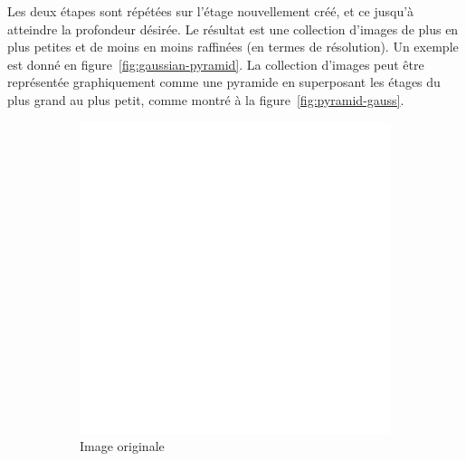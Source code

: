 \bigskip

Les deux étapes sont répétées sur l'étage nouvellement créé, et ce jusqu'à atteindre la profondeur désirée. Le résultat est une collection d'images de plus en plus petites et de moins en moins raffinées (en termes de résolution). Un exemple est donné en figure~\ref{fig:gaussian-pyramid}. La collection d'images peut être représentée graphiquement comme une pyramide en superposant les étages du plus grand au plus petit, comme montré à la figure~\ref{fig:pyramid-gauss}.

\begin{figure}[h]
    \centering

    \begin{subfigure}{.3\textwidth}
        \centering
        \includegraphics[width=\textwidth]{contenu/resources/images/gauss_0}
        \caption{Image originale}
    \end{subfigure}
    \hfill
    \begin{subfigure}{.3\textwidth}
        \centering

\end{subfigure}
\end{figure}
